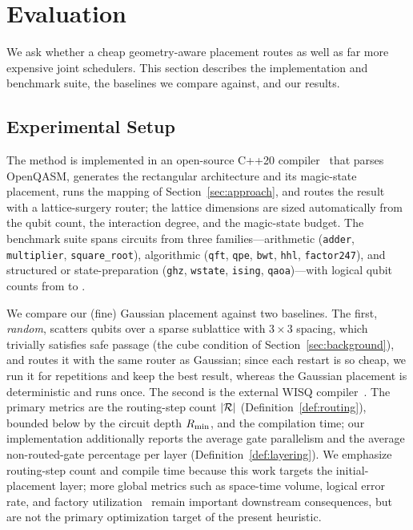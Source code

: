\section{Evaluation}
\label{sec:eval}

We ask whether a cheap geometry-aware placement routes as well as far more
expensive joint schedulers. This section describes the implementation and
benchmark suite, the baselines we compare against, and our results.

\subsection{Experimental Setup}

The method is implemented in an open-source C++20 compiler~\cite{ftqc} that parses
OpenQASM, generates the rectangular architecture and its magic-state placement,
runs the mapping of Section~\ref{sec:approach}, and routes the result with a
lattice-surgery router; the lattice dimensions are sized automatically from the
qubit count, the interaction degree, and the magic-state budget. The benchmark
suite spans  circuits from three families---arithmetic
(\texttt{adder}, \texttt{multiplier}, \texttt{square\_root}), algorithmic
(\texttt{qft}, \texttt{qpe}, \texttt{bwt}, \texttt{hhl}, \texttt{factor247}), and
structured or state-preparation (\texttt{ghz}, \texttt{wstate}, \texttt{ising},
\texttt{qaoa})---with logical qubit counts from  to .

We compare our (fine) Gaussian placement against two baselines. The first,
\emph{random}, scatters qubits over a sparse sublattice with $3\times3$ spacing,
which trivially satisfies safe passage (the cube condition of
Section~\ref{sec:background}), and routes it with the same router as Gaussian;
since each restart is so cheap, we run it for  repetitions and
keep the best result, whereas the Gaussian placement is deterministic and runs
once. The second is the external WISQ compiler~\cite{wisq}. The primary metrics
are the routing-step count $|\mathcal{R}|$ (Definition~\ref{def:routing}), bounded below
by the circuit depth $R_{\min}$, and the compilation time; our implementation
additionally reports the average gate parallelism and the average non-routed-gate
percentage per layer (Definition~\ref{def:layering}).
We emphasize routing-step count and compile time because this work targets the
initial-placement layer; more global metrics such as space-time volume, logical
error rate, and factory utilization~\cite{kan2025sparo,hamada2026routing3d} remain
important downstream consequences, but are not the primary optimization target of
the present heuristic.

